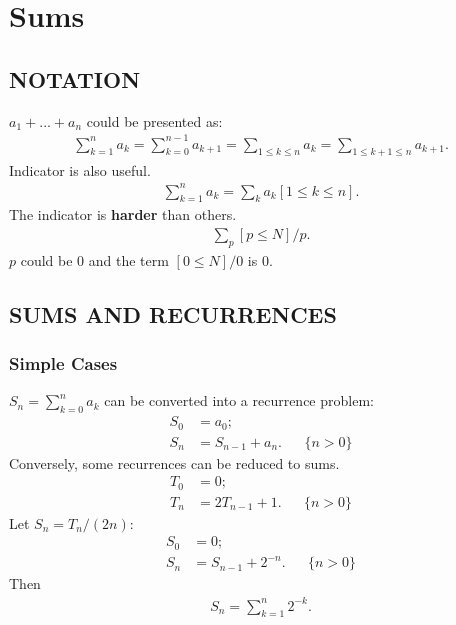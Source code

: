 \documentclass{article}
\begin{document}
\setcounter{section}{1}
\section{Sums}
\subsection{NOTATION}
$a_1 + ... + a_n$ could be presented as:
\begin{align}
\sum_{k=1}^{n}{a_k} = \sum_{k=0}^{n-1}{a_{k+1}} = \sum_{1\le k \le n}{a_k} = \sum_{1\le k+1 \le n}{a_{k+1}}.
\end{align}
Indicator is also useful.
\begin{align}
\sum_{k=1}^{n}{a_k} = \sum_{k}{a_k}[1\le k \le n].
\end{align}
The indicator is \textbf{harder} than others.
\begin{align}
\sum_{p}[p\le N]/p.
\end{align}
$p$ could be $0$ and the term $[0\le N]/0$ is 0.

\subsection{SUMS AND RECURRENCES}
\subsubsection{Simple Cases}
$S_n = \sum_{k=0}^n{a_k}$ can be converted into a recurrence problem:
\begin{align}
S_0 &= a_0;\\
S_n &= S_{n-1} + a_n. && \{n>0\}
\end{align}
Conversely, some recurrences can be reduced to sums.
\begin{align}
T_0 &= 0;\\
T_n &= 2T_{n-1}+1.&& \{n>0\}
\end{align}
Let $S_n =  T_n / (2n)$:
\begin{align}
S_0 &= 0;\\
S_n &= S_{n-1} + 2^{-n}. && \{n>0\}
\end{align}
Then
\begin{align}
S_n = \sum_{k=1}^{n}{2^{-k}}.
\end{align}
\end{document}

